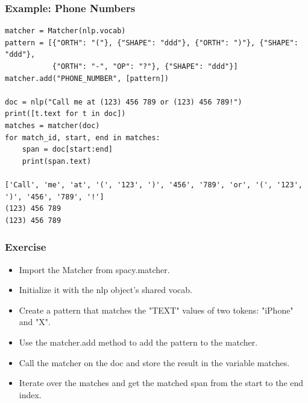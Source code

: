 \begin{frame}[fragile]\frametitle{Example: Phone Numbers}



\begin{lstlisting}
matcher = Matcher(nlp.vocab)
pattern = [{"ORTH": "("}, {"SHAPE": "ddd"}, {"ORTH": ")"}, {"SHAPE": "ddd"},
           {"ORTH": "-", "OP": "?"}, {"SHAPE": "ddd"}]
matcher.add("PHONE_NUMBER", [pattern])

doc = nlp("Call me at (123) 456 789 or (123) 456 789!")
print([t.text for t in doc])
matches = matcher(doc)
for match_id, start, end in matches:
    span = doc[start:end]
    print(span.text)
		
['Call', 'me', 'at', '(', '123', ')', '456', '789', 'or', '(', '123', ')', '456', '789', '!']
(123) 456 789
(123) 456 789		
\end{lstlisting}


\end{frame}


\begin{frame}[fragile]\frametitle{Exercise}

  \begin{itemize}
	\item Import the Matcher from spacy.matcher.
	\item Initialize it with the nlp object's shared vocab.
	\item Create a pattern that matches the "TEXT" values of two tokens: "iPhone" and "X".
	\item Use the matcher.add method to add the pattern to the matcher.
	\item Call the matcher on the doc and store the result in the variable matches.
	\item Iterate over the matches and get the matched span from the start to the end index.

  \end{itemize}
	
\end{frame}


